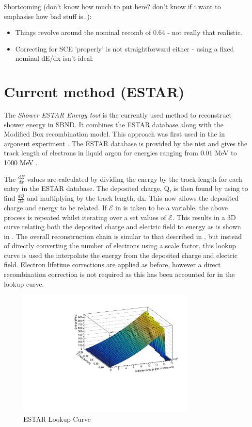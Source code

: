 Shortcoming (don't know how much to put here? don't know if i want to emphasise how bad stuff is..): 
\begin{itemize}
    \item Things revolve around the nominal recomb of 0.64 - not really that realistic. 
    \item Correcting for SCE 'properly' is not straightforward either - using a fixed nominal dE/dx isn't ideal.
\end{itemize}

\section{Current method (ESTAR)}
The \textit{Shower ESTAR Energy tool} is the currently used method to reconstruct shower energy in SBND. It combines the ESTAR database along with the Modified Box recombination model. This approach was first used in the in \Gls{argoneut} experiment \cite{ArgoNeuT_ESTAR_paper}. The ESTAR database is provided by the \Gls{nist} and gives the track length of electrons in liquid argon for energies ranging from 0.01 MeV to 1000 MeV \cite{ESTAR_Database}.

The $\frac{dE}{dx}$ values are calculated by dividing the energy by the track length for each entry in the ESTAR database. The deposited charge, Q, is then found by using  to find $\frac{dQ}{dx}$ and multiplying by the track length, dx. This now allows the deposited charge and energy to be related. If $\mathcal{E}$ in  is taken to be a variable, the above process is repeated whilst iterating over a set values of $\mathcal{E}$. This results in a 3D curve relating both the deposited charge and electric field to energy as is shown in . The overall reconstruction chain is similar to that described in , but instead of directly converting the number of electrons using a scale factor, this lookup curve is used the interpolate the energy from the deposited charge and electric field. Electron lifetime corrections are applied as before, however a direct recombination correction is not required as this has been accounted for in the lookup curve. 

\begin{figure}[h]
    \centering
    \includegraphics[width = 0.8\textwidth]{figures-chap4/ESTAR_lookup_curve.pdf}
    \caption{ESTAR Lookup Curve}
    \label{fig:ESTAR lookup curve}
\end{figure}


